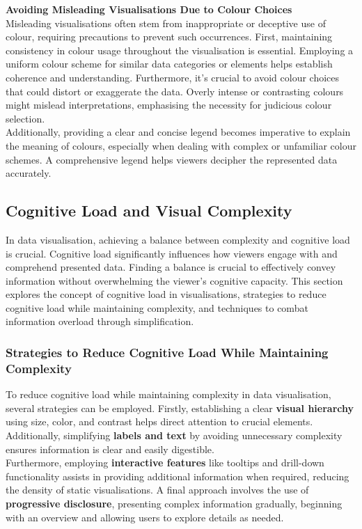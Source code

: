 \documentclass{article}\usepackage[]{graphicx}\usepackage[]{xcolor}
\begin{document}
\noindent \textbf{Avoiding Misleading Visualisations Due to Colour Choices}\\
Misleading visualisations often stem from inappropriate or deceptive use of colour, requiring precautions to prevent such occurrences. First, maintaining consistency in colour usage throughout the visualisation is essential. Employing a uniform colour scheme for similar data categories or elements helps establish coherence and understanding. Furthermore, it's crucial to avoid colour choices that could distort or exaggerate the data. Overly intense or contrasting colours might mislead interpretations, emphasising the necessity for judicious colour selection.\\

\noindent 
Additionally, providing a clear and concise legend becomes imperative to explain the meaning of colours, especially when dealing with complex or unfamiliar colour schemes. A comprehensive legend helps viewers decipher the represented data accurately.\\


\subsection{Cognitive Load and Visual Complexity}
In data visualisation, achieving a balance between complexity and cognitive load is crucial. Cognitive load significantly influences how viewers engage with and comprehend presented data. Finding a balance is crucial to effectively convey information without overwhelming the viewer's cognitive capacity. This section explores the concept of cognitive load in visualisations, strategies to reduce cognitive load while maintaining complexity, and techniques to combat information overload through simplification.

\subsubsection{Strategies to Reduce Cognitive Load While Maintaining Complexity}
To reduce cognitive load while maintaining complexity in data visualisation, several strategies can be employed. Firstly, establishing a clear \textbf{visual hierarchy} using size, color, and contrast helps direct attention to crucial elements. Additionally, simplifying \textbf{labels and text} by avoiding unnecessary complexity ensures information is clear and easily digestible.\\

\noindent Furthermore, employing \textbf{interactive features} like tooltips and drill-down functionality assists in providing additional information when required, reducing the density of static visualisations. A final approach involves the use of \textbf{progressive disclosure}, presenting complex information gradually, beginning with an overview and allowing users to explore details as needed.\\
\end{document}
